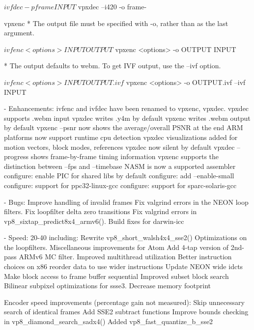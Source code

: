\begin{DoxyVerbInclude}
          $ ivfdec -p frame INPUT
          $ vpxdec --i420 -o frame-%

    vpxenc
      * The output file must be specified with -o, rather than as the
        last argument.

          $ ivfenc <options> INPUT OUTPUT
          $ vpxenc <options> -o OUTPUT INPUT

      * The output defaults to webm. To get IVF output, use the --ivf
        option.

          $ ivfenc <options> INPUT OUTPUT.ivf
          $ vpxenc <options> -o OUTPUT.ivf --ivf INPUT


  - Enhancements:
      ivfenc and ivfdec have been renamed to vpxenc, vpxdec.
      vpxdec supports .webm input
      vpxdec writes .y4m by default
      vpxenc writes .webm output by default
      vpxenc --psnr now shows the average/overall PSNR at the end
      ARM platforms now support runtime cpu detection
      vpxdec visualizations added for motion vectors, block modes, references
      vpxdec now silent by default
      vpxdec --progress shows frame-by-frame timing information
      vpxenc supports the distinction between --fps and --timebase
      NASM is now a supported assembler
      configure: enable PIC for shared libs by default
      configure: add --enable-small
      configure: support for ppc32-linux-gcc
      configure: support for sparc-solaris-gcc

  - Bugs:
      Improve handling of invalid frames
      Fix valgrind errors in the NEON loop filters.
      Fix loopfilter delta zero transitions
      Fix valgrind errors in vp8_sixtap_predict8x4_armv6().
      Build fixes for darwin-icc

  - Speed:
      20-40%
      including:
        Rewrite vp8_short_walsh4x4_sse2()
        Optimizations on the loopfilters.
        Miscellaneous improvements for Atom
        Add 4-tap version of 2nd-pass ARMv6 MC filter.
        Improved multithread utilization
        Better instruction choices on x86
        reorder data to use wider instructions
        Update NEON wide idcts
        Make block access to frame buffer sequential
        Improved subset block search
        Bilinear subpixel optimizations for ssse3.
        Decrease memory footprint

      Encoder speed improvements (percentage gain not measured):
        Skip unnecessary search of identical frames
        Add SSE2 subtract functions
        Improve bounds checking in vp8_diamond_search_sadx4()
        Added vp8_fast_quantize_b_sse2


\end{DoxyVerbInclude}
